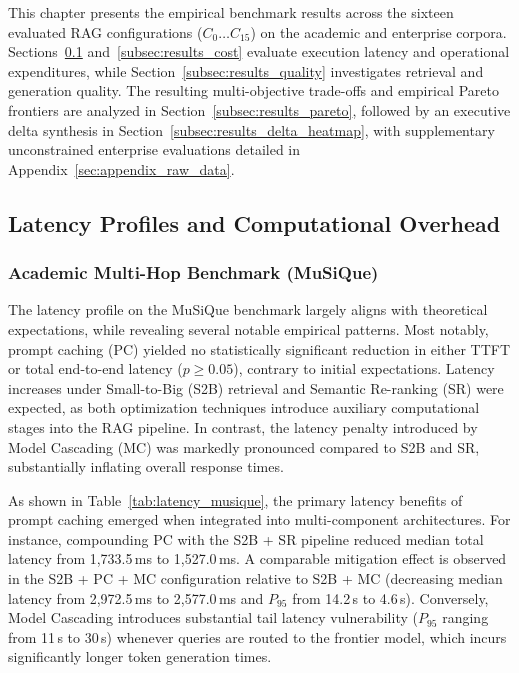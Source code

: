 This chapter presents the empirical benchmark results across the sixteen evaluated RAG configurations ($C_0 \dots C_{15}$) on the academic and enterprise corpora. Sections~\ref{subsec:results_latency} and~\ref{subsec:results_cost} evaluate execution latency and operational expenditures, while Section~\ref{subsec:results_quality} investigates retrieval and generation quality. The resulting multi-objective trade-offs and empirical Pareto frontiers are analyzed in Section~\ref{subsec:results_pareto}, followed by an executive delta synthesis in Section~\ref{subsec:results_delta_heatmap}, with supplementary unconstrained enterprise evaluations detailed in Appendix~\ref{sec:appendix_raw_data}.

\subsection{Latency Profiles and Computational Overhead}
\label{subsec:results_latency}

\subsubsection{Academic Multi-Hop Benchmark (MuSiQue)}
\label{subsubsec:latency_musique}

The latency profile on the MuSiQue benchmark largely aligns with theoretical expectations, while revealing several notable empirical patterns. Most notably, prompt caching (PC) yielded no statistically significant reduction in either TTFT or total end-to-end latency ($p \ge 0.05$), contrary to initial expectations. Latency increases under Small-to-Big (S2B) retrieval and Semantic Re-ranking (SR) were expected, as both optimization techniques introduce auxiliary computational stages into the RAG pipeline. In contrast, the latency penalty introduced by Model Cascading (MC) was markedly pronounced compared to S2B and SR, substantially inflating overall response times.  



As shown in Table~\ref{tab:latency_musique}, the primary latency benefits of prompt caching emerged when integrated into multi-component architectures. For instance, compounding PC with the S2B + SR pipeline reduced median total latency from 1,733.5\,ms to 1,527.0\,ms. A comparable mitigation effect is observed in the S2B + PC + MC configuration relative to S2B + MC (decreasing median latency from 2,972.5\,ms to 2,577.0\,ms and $P_{95}$ from 14.2\,s to 4.6\,s). Conversely, Model Cascading introduces substantial tail latency vulnerability ($P_{95}$ ranging from 11\,s to 30\,s) whenever queries are routed to the frontier model, which incurs significantly longer token generation times.

